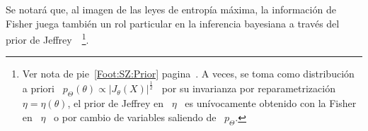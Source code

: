 Se notar\'a que, al imagen de las leyes de entrop\'ia m\'axima, la informaci\'on
de  Fisher  juega tambi\'en  un  rol particular  en  la  inferencia bayesiana  a
trav\'es del prior de Jeffrey~\cite{Jef46, Jef48, LehCas98, Rob07}~\footnote{Ver
  nota de  pie~\ref{Foot:SZ:Prior} pagina~\pageref{Foot:SZ:Prior}.  A  veces, se
  toma    como   distribuci\'on   a    priori   \    $p_\Theta(\theta)   \propto
  |J_\theta(X)|^\frac12$ \  por su invarianza por reparametrizaci\'on  \ $\eta =
  \eta(\theta)$,  \ie  el prior  de  Jeffrey en  \  $\eta$  \ es  un\'ivocamente
  obtenido con la Fisher  en \ $\eta$ \ o por cambio  de variables saliendo de \
  $p_\Theta$.}.



\label{Sssec:SZ:FisherCurvatura}


